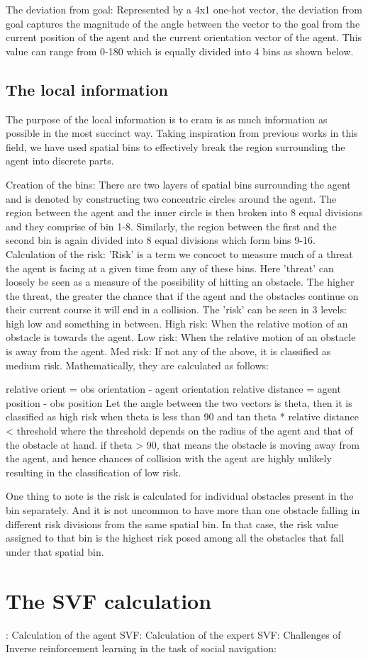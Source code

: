 The deviation from goal: Represented by a 4x1 one-hot vector, the deviation from goal captures the magnitude of the angle between the vector to the goal from the current position of the agent and the current orientation vector of the agent. This value can range from 0-180 which is equally divided into 4 bins as shown below.

\subsection*{The local information}
The purpose of the local information is to cram is as much information as possible in the most succinct way. Taking inspiration from previous works in this field, we have used spatial bins to effectively break the region surrounding the agent into discrete parts.

Creation of the bins:
There are two layers of spatial bins surrounding the agent and is denoted by constructing two concentric circles around the agent. The region between the agent and the inner circle is then broken into 8 equal divisions and they comprise of bin 1-8. Similarly, the region between the first and the second bin is again divided into 8 equal divisions which form bins 9-16.
Calculation of the risk:
'Risk' is a term we concoct to measure much of a  threat the agent is facing at a given time from any of these bins. Here 'threat' can loosely be seen as a measure of the possibility of hitting an obstacle. The higher the threat, the greater the chance that if the agent and the obstacles continue on their current course it will end in a collision.
The 'risk' can be seen in 3 levels:
high low and something in between.
High risk:
When the relative motion of an obstacle is towards the agent.
Low risk:
When the relative motion of an obstacle is away from the agent.
Med risk:
If not any of the above, it is classified as medium risk.
Mathematically, they are calculated as follows:

relative orient = obs orientation - agent orientation
relative distance = agent position - obs position
Let the angle between the two vectors is theta, then it is classified as high risk when
theta is less than 90 and tan theta * relative distance < threshold
where the threshold depends on the radius of the agent and that of the obstacle at hand.
if theta > 90, that means the obstacle is moving away from the agent, and hence chances of collision with the agent are highly unlikely resulting in the classification of low risk.

One thing to note is the risk is calculated for individual obstacles present in the bin separately. And it is not uncommon to have more than one obstacle falling in different risk divisions from the same spatial bin. In that case, the risk value assigned to that bin is the highest risk posed among all the obstacles that fall under that spatial bin.

\section*{The SVF calculation}:
Calculation of the agent SVF:
Calculation of the expert SVF:
Challenges of Inverse reinforcement learning in the task of social navigation:



